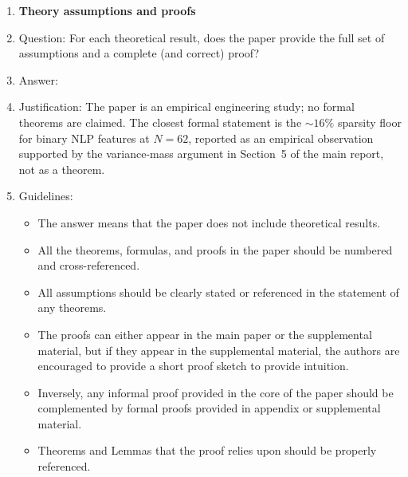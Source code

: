 \documentclass{article}
\begin{document}
\begin{enumerate}
\begin{itemize}
        \item While the authors might fear that complete honesty about limitations might be used by reviewers as grounds for rejection, a worse outcome might be that reviewers discover limitations that aren't acknowledged in the paper. The authors should use their best judgment and recognize that individual actions in favor of transparency play an important role in developing norms that preserve the integrity of the community. Reviewers will be specifically instructed to not penalize honesty concerning limitations.
    \end{itemize}

\item {\bf Theory assumptions and proofs}
    \item[] Question: For each theoretical result, does the paper provide the full set of assumptions and a complete (and correct) proof?
    \item[] Answer: \answerNA{}
    \item[] Justification: The paper is an empirical engineering study; no formal theorems are claimed. The closest formal statement is the $\sim 16\%$ sparsity floor for binary NLP features at $N{=}62$, reported as an empirical observation supported by the variance-mass argument in Section~5 of the main report, not as a theorem.
    \item[] Guidelines:
    \begin{itemize}
        \item The answer \answerNA{} means that the paper does not include theoretical results.
        \item All the theorems, formulas, and proofs in the paper should be numbered and cross-referenced.
        \item All assumptions should be clearly stated or referenced in the statement of any theorems.
        \item The proofs can either appear in the main paper or the supplemental material, but if they appear in the supplemental material, the authors are encouraged to provide a short proof sketch to provide intuition.
        \item Inversely, any informal proof provided in the core of the paper should be complemented by formal proofs provided in appendix or supplemental material.
        \item Theorems and Lemmas that the proof relies upon should be properly referenced.
    \end{itemize}


\end{enumerate}
\end{document}
